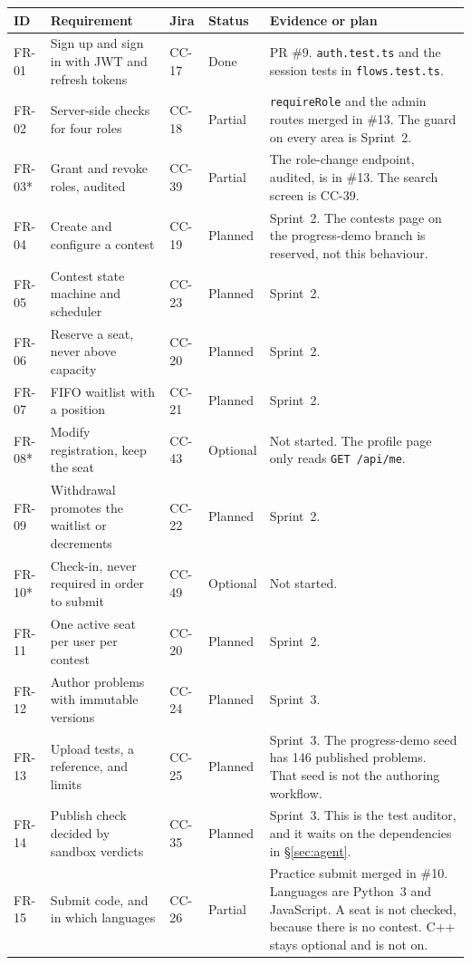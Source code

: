 \documentclass[11pt,a4paper]{article}
\begin{document}
{\footnotesize
\begin{longtable}{@{}l p{} l l p{}@{}}
\toprule
\rowcolor{thead} ID & Requirement & Jira & Status & Evidence or plan \\
\midrule
\endhead
FR-01 & Sign up and sign in with JWT and refresh tokens & CC-17 & Done &
PR \#9. \texttt{auth.test.ts} and the session tests in \texttt{flows.test.ts}. \\
FR-02 & Server-side checks for four roles & CC-18 & Partial &
\texttt{requireRole} and the admin routes merged in \#13. The guard on every area is Sprint~2. \\
FR-03* & Grant and revoke roles, audited & CC-39 & Partial &
The role-change endpoint, audited, is in \#13. The search screen is CC-39. \\
FR-04 & Create and configure a contest & CC-19 & Planned & Sprint~2. The contests page on the progress-demo branch is reserved, not this behaviour. \\
FR-05 & Contest state machine and scheduler & CC-23 & Planned & Sprint~2. \\
FR-06 & Reserve a seat, never above capacity & CC-20 & Planned & Sprint~2. \\
FR-07 & FIFO waitlist with a position & CC-21 & Planned & Sprint~2. \\
FR-08* & Modify registration, keep the seat & CC-43 & Optional & Not started. The profile page only reads \texttt{GET /api/me}. \\
FR-09 & Withdrawal promotes the waitlist or decrements & CC-22 & Planned & Sprint~2. \\
FR-10* & Check-in, never required in order to submit & CC-49 & Optional & Not started. \\
FR-11 & One active seat per user per contest & CC-20 & Planned & Sprint~2. \\
FR-12 & Author problems with immutable versions & CC-24 & Planned & Sprint~3. \\
FR-13 & Upload tests, a reference, and limits & CC-25 & Planned &
Sprint~3. The progress-demo seed has 146 published problems. That seed is not the authoring workflow. \\
FR-14 & Publish check decided by sandbox verdicts & CC-35 & Planned &
Sprint~3. This is the test auditor, and it waits on the dependencies in \S\ref{sec:agent}. \\
FR-15 & Submit code, and in which languages & CC-26 & Partial &
Practice submit merged in \#10. Languages are Python~3 and JavaScript. A seat is not checked, because there is no contest. C++ stays optional and is not on. \\

\end{longtable}}
\end{document}
